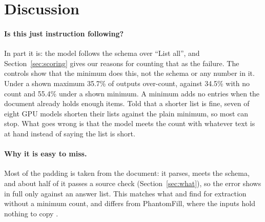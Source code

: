 \section{Discussion}
\label{sec:discussion}

\paragraph{Is this just instruction following?}
In part it is: the model follows the schema over ``List all'', and Section~\ref{sec:scoring} gives our reasons for counting that as the failure.
The controls show that the minimum does this, not the schema or any number in it.
Under a shown maximum 35.7\% of outputs over-count, against 34.5\% with no count and 55.4\% under a shown minimum.
A minimum adds no entries when the document already holds enough items.
Told that a shorter list is fine, seven of eight GPU models shorten their lists against the plain minimum, so most can stop.
What goes wrong is that the model meets the count with whatever text is at hand instead of saying the list is short.

\paragraph{Why it is easy to miss.}
Most of the padding is taken from the document: it parses, meets the schema, and about half of it passes a source check (Section~\ref{sec:what}), so the error shows in full only against an answer list.
This matches what \citet{han2023empirical} and \citet{qian2026unreliable} find for extraction without a minimum count, and differs from PhantomFill, where the inputs hold nothing to copy \citep{usman2026phantomfill}.

